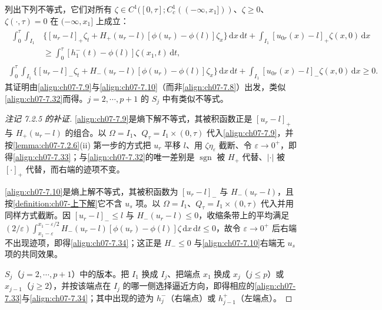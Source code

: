\documentclass[../../main.tex]{subfiles}%
\begin{document}
\begin{remark}\label{remark:ch07-7.2.5}
列出下列不等式，它们对所有 $\zeta\in C^1([0,\tau];C^1_c((-\infty,x_1]))$、$\zeta\geqslant0$、$\zeta(\cdot,\tau)=0$ 在 $(-\infty,x_1]$ 上成立：
\begin{align}
\begin{aligned}
\int_0^\tau\int_{I_1}&\{[u_r-l]_+\zeta_t+H_+(u_r-l)[\phi(u_r)-\phi(l)]\zeta_x\}\,\mathrm{d}x\,\mathrm{d}t
+\int_{I_1}[u_{0r}(x)-l]_+\zeta(x,0)\,\mathrm{d}x\\
&\geqslant\int_0^\tau[h_1^-(t)-\phi(l)]\zeta(x_1,t)\,\mathrm{d}t,
\end{aligned} 
\label{align:ch07-7.33}
\end{align}
\begin{align}
\int_0^\tau\int_{I_1}\{[u_r-l]_-\zeta_t+H_-(u_r-l)[\phi(u_r)-\phi(l)]\zeta_x\}\,\mathrm{d}x\,\mathrm{d}t
+\int_{I_1}[u_{0r}(x)-l]_-\zeta(x,0)\,\mathrm{d}x\geqslant0. \label{align:ch07-7.34}
\end{align}
其证明由\eqref{align:ch07-7.9}与\eqref{align:ch07-7.10}（而非\eqref{align:ch07-7.8}）出发，类似\eqref{align:ch07-7.32}而得。$j=2,\cdots,p+1$ 的 $S_j$ 中有类似不等式。
\end{remark}

\begin{proof}[注记 7.2.5 的补证]
\eqref{align:ch07-7.9}是熵下解不等式，其被积函数正是 $[u_r-l]_+$ 与 $H_+(u_r-l)$ 的组合。以 $\Omega=I_1$、$Q_\tau=I_1\times(0,\tau)$ 代入\eqref{align:ch07-7.9}，并按\cref{lemma:ch07-7.2.6}(ii) 第一步的方式把 $u_r$ 平移 $l$、用 $\zeta\eta_\varepsilon$ 截断、令 $\varepsilon\to0^+$，即得\eqref{align:ch07-7.33}；与\eqref{align:ch07-7.32}的唯一差别是 $\operatorname{sgn}$ 被 $H_+$ 代替、$|\cdot|$ 被 $[\cdot]_+$ 代替，而右端的迹项不变。

\eqref{align:ch07-7.10}是熵上解不等式，其被积函数为 $[u_r-l]_-$ 与 $H_-(u_r-l)$，且按\cref{definition:ch07-上下解}它不含 $u_s$ 项。以 $\Omega=I_1$、$Q_\tau=I_1\times(0,\tau)$ 代入并用同样方式截断。因 $[u_r-l]_-\leqslant l$ 与 $H_-(u_r-l)\leqslant0$，收缩条带上的平均满足 $(2/\varepsilon)\int_{x_1-\varepsilon}^{x_1-\varepsilon/2}H_-(u_r-l)[\phi(u_r)-\phi(l)]\zeta\,\mathrm{d}x\,\mathrm{d}t\leqslant0$，故令 $\varepsilon\to0^+$ 后右端不出现迹项，即得\eqref{align:ch07-7.34}；这正是 $H_-\leqslant0$ 与\eqref{align:ch07-7.10}右端无 $u_s$ 项的共同效果。

$S_j$（$j=2,\cdots,p+1$）中的版本。把 $I_1$ 换成 $I_j$、把端点 $x_1$ 换成 $x_j$（$j\leqslant p$）或 $x_{j-1}$（$j\geqslant2$），并按该端点在 $I_j$ 的哪一侧选择逼近方向，即得相应的\eqref{align:ch07-7.33}与\eqref{align:ch07-7.34}；其中出现的迹为 $h_j^-$（右端点）或 $h_{j-1}^+$（左端点）。
\end{proof}
\end{document}
